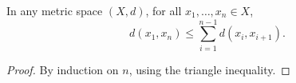 \begin{lemma}\label{lem:triangle-inequality}
  In any metric space $(X, d)$, for all $x_1, \ldots, x_n \in X$,
  \begin{equation}\label{eq:generalized-triangle}
  d(x_1, x_n) \le \sum_{i=1}^{n-1} d(x_i, x_{i+1}).
  \end{equation}
\end{lemma}

\begin{proof}
  By induction on $n$, using the triangle inequality.
\end{proof}

